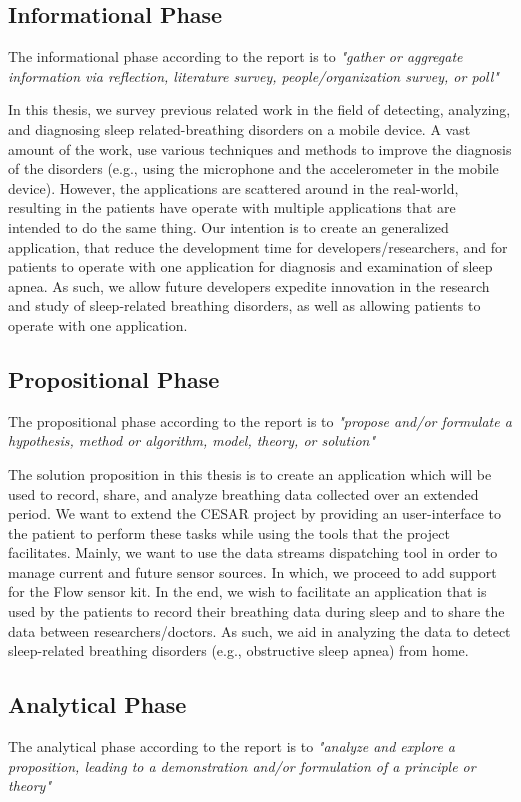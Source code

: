 \subsection{Informational Phase}
The informational phase according to the report is to \textit{"gather or aggregate information via reflection, literature survey, people/organization survey, or poll"}

In this thesis, we survey previous related work in the field of detecting, analyzing, and diagnosing sleep related-breathing disorders on a mobile device. A vast amount of the work, use various techniques and methods to improve the diagnosis of the disorders (e.g., using the microphone and the accelerometer in the mobile device). However, the applications are scattered around in the real-world, resulting in the patients have operate with multiple applications that are intended to do the same thing. Our intention is to create an generalized application, that reduce the development time for developers/researchers, and for patients to operate with one application for diagnosis and examination of sleep apnea. As such, we allow future developers expedite innovation in the research and study of sleep-related breathing disorders, as well as allowing patients to operate with one application. 

\subsection{Propositional Phase}
The propositional phase according to the report is to \textit{"propose and/or formulate a hypothesis, method or algorithm, model, theory, or solution"}

The solution proposition in this thesis is to create an application which will be used to record, share, and analyze breathing data collected over an extended period. We want to extend the CESAR project by providing an user-interface to the patient to perform these tasks while using the tools that the project facilitates. Mainly, we want to use the data streams dispatching tool in order to manage current and future sensor sources. In which, we proceed to add support for the Flow sensor kit. In the end, we wish to facilitate an application that is used by the patients to record their breathing data during sleep and to share the data between researchers/doctors. As such, we aid in analyzing the data to detect sleep-related breathing disorders (e.g., obstructive sleep apnea) from home. 

\subsection{Analytical Phase}
The analytical phase according to the report is to \textit{"analyze and explore a proposition, leading to a demonstration and/or formulation of a principle or theory"}

